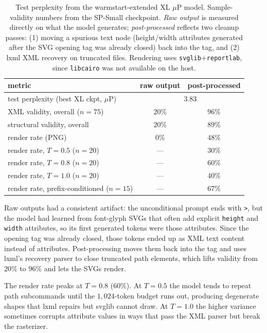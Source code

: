 \documentclass[11pt]{article}
\begin{document}
\begin{table}[t]
\centering
\small
\begin{tabular}{lcc}
\toprule
metric & raw output & post-processed \\
\midrule
test perplexity (best XL ckpt, $\mu$P) & \multicolumn{2}{c}{3.83} \\
\midrule
XML validity, overall ($n\!=\!75$) & $20\%$ & $96\%$ \\
structural validity, overall & $20\%$ & $89\%$ \\
render rate (PNG) & $0\%$ & $48\%$ \\
\midrule
render rate, $T\!=\!0.5$ ($n\!=\!20$) & --- & $30\%$ \\
render rate, $T\!=\!0.8$ ($n\!=\!20$) & --- & $60\%$ \\
render rate, $T\!=\!1.0$ ($n\!=\!20$) & --- & $40\%$ \\
render rate, prefix-conditioned ($n\!=\!15$) & --- & $67\%$ \\
\bottomrule
\end{tabular}
\caption{Test perplexity from the warmstart-extended XL $\mu$P model. Sample-validity numbers from the SP-Small checkpoint. \emph{Raw output} is measured directly on what the model generates; \emph{post-processed} reflects two cleanup passes: (1) moving a spurious text node (height/width attributes generated after the SVG opening tag was already closed) back into the tag, and (2) lxml XML recovery on truncated files. Rendering uses \texttt{svglib}$+$\texttt{reportlab}, since \texttt{libcairo} was not available on the host.}
\label{tab:metrics}
\end{table}

Raw outputs had a consistent artifact: the unconditional prompt ends with \texttt{>}, but the model had learned from font-glyph SVGs that often add explicit \texttt{height} and \texttt{width} attributes, so its first generated tokens were those attributes. Since the opening tag was already closed, those tokens ended up as XML text content instead of attributes. Post-processing moves them back into the tag and uses lxml's recovery parser to close truncated path elements, which lifts validity from $20\%$ to $96\%$ and lets the SVGs render.

The render rate peaks at $T\!=\!0.8$ ($60\%$). At $T\!=\!0.5$ the model tends to repeat path subcommands until the $1{,}024$-token budget runs out, producing degenerate shapes that lxml repairs but svglib cannot draw. At $T\!=\!1.0$ the higher variance sometimes corrupts attribute values in ways that pass the XML parser but break the rasterizer.
\end{document}
